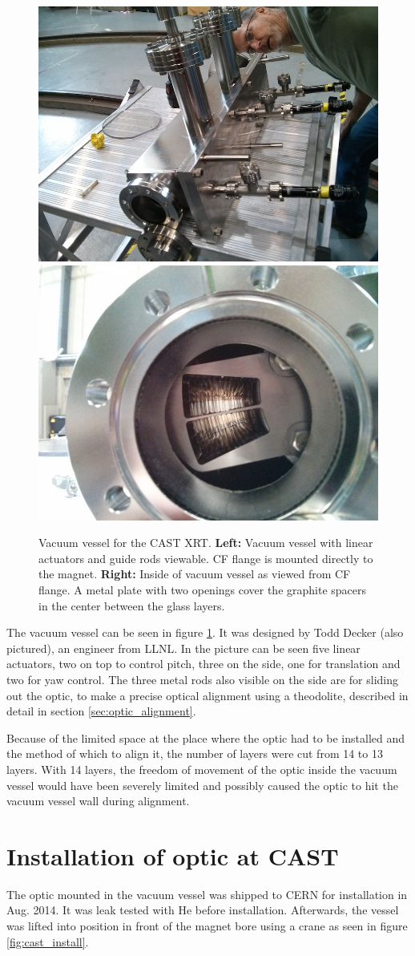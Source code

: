 \begin{figure}[htbp]
  \centering
    \includegraphics[width=0.45\linewidth]{figures/cast/cast_vessel1.jpg}
    \includegraphics[width=0.45\linewidth]{figures/cast/cast_vessel2.jpg}
  \caption{\footnotesize Vacuum vessel for the CAST XRT. \textbf{Left:} Vacuum vessel with linear actuators and guide rods viewable. CF flange is mounted directly to the magnet. \textbf{Right:} Inside of vacuum vessel as viewed from CF flange. A metal plate with two openings cover the graphite spacers in the center between the glass layers. }
  \label{fig:cast_vessel}
\end{figure}

The vacuum vessel can be seen in figure \ref{fig:cast_vessel}. It was designed by Todd Decker (also pictured), an engineer from LLNL. In the picture can be seen five linear actuators, two on top to control pitch, three on the side, one for translation and two for yaw control. The three metal rods also visible on the side are for sliding out the optic, to make a precise optical alignment using a theodolite, described in detail in section \ref{sec:optic_alignment}.

Because of the limited space at the place where the optic had to be installed and the method of which to align it, the number of layers were cut from 14 to 13 layers. With 14 layers, the freedom of movement of the optic inside the vacuum vessel would have been severely limited and possibly caused the optic to hit the vacuum vessel wall during alignment.

\section{Installation of optic at CAST}
The optic mounted in the vacuum vessel was shipped to CERN for installation in Aug. 2014. It was leak tested with He before installation. Afterwards, the vessel was lifted into position in front of the magnet bore using a crane as seen in figure \ref{fig:cast_install}.

